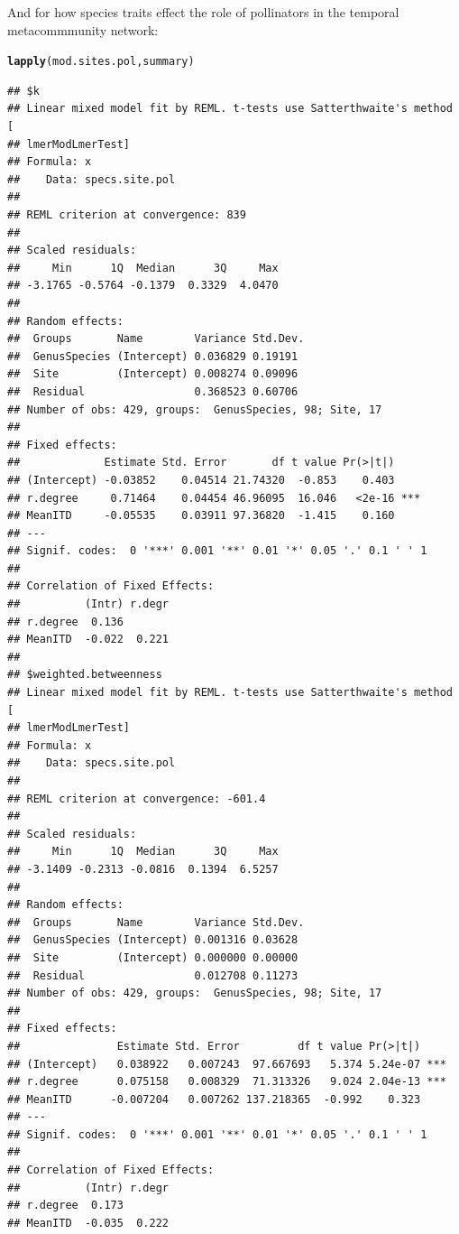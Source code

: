 \documentclass{article}\usepackage[]{graphicx}\usepackage[]{color}
\makeatletter
\newcommand{\hlstd}[1]{\textcolor[rgb]{0.345,0.345,0.345}{#1}}%
\newcommand{\hlkwd}[1]{\textcolor[rgb]{0.737,0.353,0.396}{\textbf{#1}}}%
\newenvironment{kframe}{%
 \def\at@end@of@kframe{}%
 \ifinner\ifhmode%
  \def\at@end@of@kframe{\end{minipage}}%
  \begin{minipage}{\columnwidth}%
 \fi\fi%
 \def\FrameCommand##1{\hskip\@totalleftmargin \hskip-\fboxsep
 \colorbox{shadecolor}{##1}\hskip-\fboxsep
     \hskip-\linewidth \hskip-\@totalleftmargin \hskip\columnwidth}%
 \MakeFramed {\advance\hsize-\width
   \@totalleftmargin\z@ \linewidth\hsize
   \@setminipage}}%
 {\par\unskip\endMakeFramed%
 \at@end@of@kframe}
\newenvironment{knitrout}{}{} %
\makeatother
\begin{document}
\clearpage

And for how species traits effect the role of pollinators in
the temporal metacommmunity network: 
\begin{knitrout}
\color{fgcolor}\begin{kframe}
\begin{alltt}
\hlkwd{lapply}\hlstd{(mod.sites.pol, summary)}
\end{alltt}
\begin{verbatim}
## $k
## Linear mixed model fit by REML. t-tests use Satterthwaite's method [
## lmerModLmerTest]
## Formula: x
##    Data: specs.site.pol
## 
## REML criterion at convergence: 839
## 
## Scaled residuals: 
##     Min      1Q  Median      3Q     Max 
## -3.1765 -0.5764 -0.1379  0.3329  4.0470 
## 
## Random effects:
##  Groups       Name        Variance Std.Dev.
##  GenusSpecies (Intercept) 0.036829 0.19191 
##  Site         (Intercept) 0.008274 0.09096 
##  Residual                 0.368523 0.60706 
## Number of obs: 429, groups:  GenusSpecies, 98; Site, 17
## 
## Fixed effects:
##             Estimate Std. Error       df t value Pr(>|t|)    
## (Intercept) -0.03852    0.04514 21.74320  -0.853    0.403    
## r.degree     0.71464    0.04454 46.96095  16.046   <2e-16 ***
## MeanITD     -0.05535    0.03911 97.36820  -1.415    0.160    
## ---
## Signif. codes:  0 '***' 0.001 '**' 0.01 '*' 0.05 '.' 0.1 ' ' 1
## 
## Correlation of Fixed Effects:
##          (Intr) r.degr
## r.degree  0.136       
## MeanITD  -0.022  0.221
## 
## $weighted.betweenness
## Linear mixed model fit by REML. t-tests use Satterthwaite's method [
## lmerModLmerTest]
## Formula: x
##    Data: specs.site.pol
## 
## REML criterion at convergence: -601.4
## 
## Scaled residuals: 
##     Min      1Q  Median      3Q     Max 
## -3.1409 -0.2313 -0.0816  0.1394  6.5257 
## 
## Random effects:
##  Groups       Name        Variance Std.Dev.
##  GenusSpecies (Intercept) 0.001316 0.03628 
##  Site         (Intercept) 0.000000 0.00000 
##  Residual                 0.012708 0.11273 
## Number of obs: 429, groups:  GenusSpecies, 98; Site, 17
## 
## Fixed effects:
##               Estimate Std. Error         df t value Pr(>|t|)    
## (Intercept)   0.038922   0.007243  97.667693   5.374 5.24e-07 ***
## r.degree      0.075158   0.008329  71.313326   9.024 2.04e-13 ***
## MeanITD      -0.007204   0.007262 137.218365  -0.992    0.323    
## ---
## Signif. codes:  0 '***' 0.001 '**' 0.01 '*' 0.05 '.' 0.1 ' ' 1
## 
## Correlation of Fixed Effects:
##          (Intr) r.degr
## r.degree  0.173       
## MeanITD  -0.035  0.222
\end{verbatim}
\end{kframe}
\end{knitrout}
\end{document}
